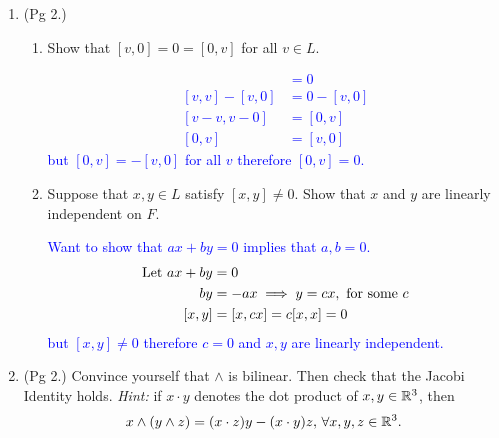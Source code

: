 \documentclass[12pt,a4paper]{report}
\newcommand{\BLUE}[1]{\textcolor{blue}{#1}}
\begin{document}
\begin{enumerate}[label=\textit{1.\arabic*}]

\item (Pg 2.)  \begin{enumerate}
	\item Show that $[v,0] = 0 = [0,v]$ for all $ v \in L$.
	
	\BLUE{\begin{align*}
		[v, v] &= 0 \\
		[v, v] - [v, 0] &= 0 - [v, 0] \\
		[v-v, v-0] &= [0,v] \\
		[0,v] &= [v, 0]
	\end{align*}	but $[0,v] = -[v, 0]$ for all $v$ therefore $[0,v] = 0$.
	}
	
	\item Suppose that $x,y \in L$ satisfy $[x,y] \ne 0$.  Show that $x$ and $y$ are linearly independent on $F$.
	
	\BLUE{Want to show that $ax + by=0$ implies that $a, b = 0$.
	\begin{align*}
		\text{Let } ax + by &= 0 \\
		by &= -ax \implies y = cx, \text{ for some } c\\
		[x,y] &= [x,cx] = c[x,x] = 0
	\end{align*}but $[x,y]\ne 0$ therefore $c = 0$ and $x,y$ are linearly independent.
	}
\end{enumerate}

\item (Pg 2.) Convince yourself that $\wedge$ is bilinear. Then check that the Jacobi Identity holds. \textit{Hint: } if $x \cdot y$ denotes the dot product  of $x,y \in \mathbb{R}^3$, then 
\begin{align*}
	x\wedge(y\wedge z) = (x\cdot{z})y-(x\cdot y)z,\, \forall x,y,z \in \mathbb{R}^3.
\end{align*}


\end{enumerate}
\end{document}
